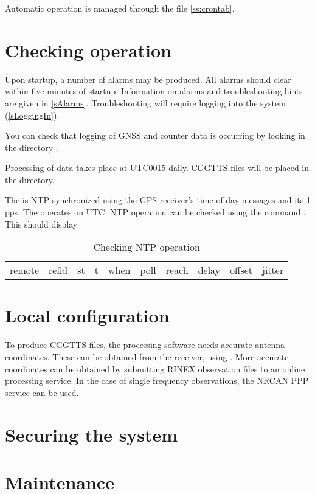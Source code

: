 Automatic operation is managed through the   file \ref{ss:crontab}.
\section{Checking  operation}

Upon startup, a number of alarms may be produced. 
All alarms should clear within five minutes of startup.
Information on alarms and troubleshooting hints are given in \ref{sAlarms}. Troubleshooting
will require logging into the system (\ref{sLoggingIn}).

You can check that logging of GNSS and counter data is occurring by looking in the directory 
.

Processing of data takes place at UTC0015 daily. CGGTTS files will be placed in the 
 directory.

The \sysname{} is NTP-synchronized using the GPS receiver's time of day messages and its 1 pps. 
The \sysname{} operates on UTC. 
NTP operation can be checked using the command . This should display 

\begin{table}
\begin{tabular}{clrrrrrrrr}
     remote      &     refid   &   st & t &  when &poll & reach  &  delay &  offset & jitter \\

\end{tabular}
\caption{Checking NTP operation}
\end{table}

\section{Local configuration}

To produce CGGTTS files, the processing software needs accurate antenna coordinates.
These can be obtained from the \sysname{} receiver, using .
More accurate coordinates can be obtained by submitting RINEX observation files to an online
processing service. In the case of single frequency observations, the NRCAN PPP service can be used.
\section{Securing the system}

\section{Maintenance}

